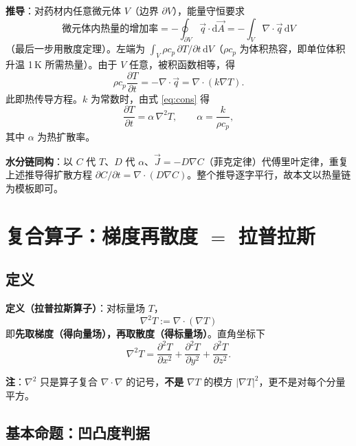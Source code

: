 \documentclass[12pt,a4paper]{ctexart}
\begin{document}
\textbf{推导}：对药材内任意微元体 $V$（边界 $\partial V$），能量守恒要求
\begin{equation}
\text{微元体内热量的增加率}=-\oint_{\partial V}\vec{q}\cdot\mathrm{d}\vec{A}
=-\int_V\nabla\cdot\vec{q}\,\mathrm{d}V
\end{equation}
（最后一步用散度定理）。左端为 $\int_V\rho c_p\,\partial T/\partial t\,\mathrm{d}V$（$\rho c_p$ 为体积热容，即单位体积升温 1\,K 所需热量）。由于 $V$ 任意，被积函数相等，得
\begin{equation}
\rho c_p\frac{\partial T}{\partial t}=-\nabla\cdot\vec{q}=\nabla\cdot(k\nabla T).
\label{eq:cons}
\end{equation}
此即热传导方程。$k$ 为常数时，由式 \eqref{eq:cons} 得
\begin{equation}
\frac{\partial T}{\partial t}=\alpha\,\nabla^2 T,\qquad \alpha=\frac{k}{\rho c_p},
\label{eq:heat-alpha}
\end{equation}
其中 $\alpha$ 为热扩散率。

\textbf{水分链同构}：以 $C$ 代 $T$、$D$ 代 $\alpha$、$\vec{J}=-D\nabla C$（菲克定律）代傅里叶定律，重复上述推导得扩散方程 $\partial C/\partial t=\nabla\cdot(D\nabla C)$。整个推导逐字平行，故本文以热量链为模板即可。

\section{复合算子：梯度再散度 $=$ 拉普拉斯}

\subsection{定义}
\label{def:lap}

\textbf{定义（拉普拉斯算子）}：对标量场 $T$，
\begin{equation}
\nabla^2 T:=\nabla\cdot(\nabla T)
\end{equation}
即\textbf{先取梯度（得向量场），再取散度（得标量场）}。直角坐标下
\begin{equation}
\nabla^2 T=\frac{\partial^2 T}{\partial x^2}+\frac{\partial^2 T}{\partial y^2}+\frac{\partial^2 T}{\partial z^2}.
\end{equation}

\textbf{注}：$\nabla^2$ 只是算子复合 $\nabla\cdot\nabla$ 的记号，\textbf{不是} $\nabla T$ 的模方 $|\nabla T|^2$，更不是对每个分量平方。

\subsection{基本命题：凹凸度判据}
\end{document}
